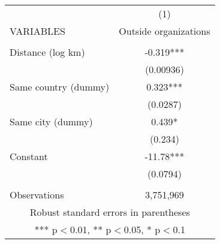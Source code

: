 \begin{tabular}{lc} \hline
 & (1) \\
VARIABLES & Outside organizations \\ \hline
 &  \\
Distance (log km) & -0.319*** \\
 & (0.00936) \\
Same country (dummy) & 0.323*** \\
 & (0.0287) \\
Same city (dummy) & 0.439* \\
 & (0.234) \\
Constant & -11.78*** \\
 & (0.0794) \\
 &  \\
 Observations & 3,751,969 \\ \hline
\multicolumn{2}{c}{ Robust standard errors in parentheses} \\
\multicolumn{2}{c}{ *** p$<$0.01, ** p$<$0.05, * p$<$0.1} \\
\end{tabular}
